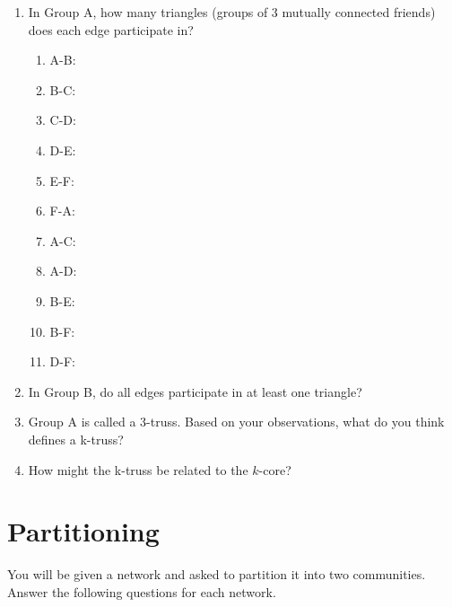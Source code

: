 \documentclass[a4paper, 14pt]{extarticle}
\begin{document}
\begin{enumerate}[resume]
    \item In Group A, how many triangles (groups of 3 mutually connected friends) does each edge participate in? \underline{\hspace{2cm}}
    \begin{enumerate}
        \item A-B: \underline{\hspace{2cm}}
        \item B-C: \underline{\hspace{2cm}}
        \item C-D: \underline{\hspace{2cm}}
        \item D-E: \underline{\hspace{2cm}}
        \item E-F: \underline{\hspace{2cm}}
        \item F-A: \underline{\hspace{2cm}}
        \item A-C: \underline{\hspace{2cm}}
        \item A-D: \underline{\hspace{2cm}}
        \item B-E: \underline{\hspace{2cm}}
        \item B-F: \underline{\hspace{2cm}}
        \item D-F: \underline{\hspace{2cm}}
    \end{enumerate}
    \item In Group B, do all edges participate in at least one triangle? \underline{\hspace{2cm}}
    \item Group A is called a 3-truss. Based on your observations, what do you think defines a k-truss?
    \item How might the k-truss be related to the $k$-core?
\end{enumerate}

\section{Partitioning}

You will be given a network and asked to partition it into two communities. Answer the following questions for each network.
\end{document}
